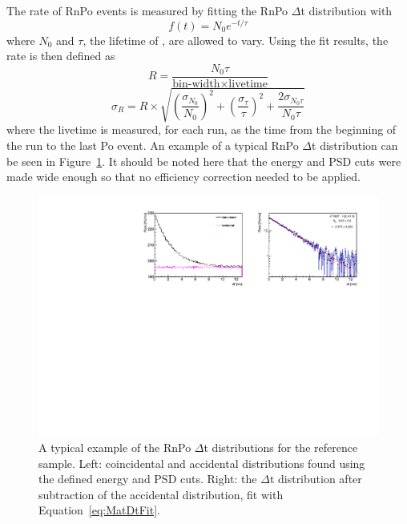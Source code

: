 The rate of RnPo events is measured by fitting the RnPo $\Delta$t distribution with
\begin{equation}
	f(t) = N_0e^{-t/\tau}
	\label{eq:MatDtFit}
\end{equation}
where $N_0$ and $\tau$, the lifetime of \Po, are allowed to vary. 
Using the fit results, the rate is then defined as
\begin{equation}
	R = \frac{N_0 \tau}{\textrm{bin-width}\times\textrm{livetime}}
\end{equation}
\begin{equation}
	\sigma_R = R \times \sqrt{  \left(\frac{\sigma_{N_0}}{N_0}\right)^2 + \left(\frac{\sigma_{\tau}}{\tau}\right)^2 + \frac{2\sigma_{N_{0}\tau}}{N_0\tau} }
\end{equation}
where the livetime is measured, for each run, as the time from the beginning of the run to the last Po event. 
An example of a typical RnPo $\Delta$t distribution can be seen in Figure~\ref{fig:rnpodttimebin23s2}. It should be noted here that the energy and PSD cuts were made wide enough so that no efficiency correction needed to be applied.

\begin{figure}[H]
	\centering
	\includegraphics[width=1.\linewidth]{"tex/6-ac227-images/BNL/RnPoDt_TimeBin23_S2"}
	\caption[Typical RnPo $\Delta$t distribution]{A typical example of the RnPo $\Delta$t distributions for the reference sample. Left: coincidental and accidental distributions found using the defined energy and PSD cuts. Right: the $\Delta$t distribution after subtraction of the accidental distribution, fit with Equation~\ref{eq:MatDtFit}.}
	\label{fig:rnpodttimebin23s2}
\end{figure}


